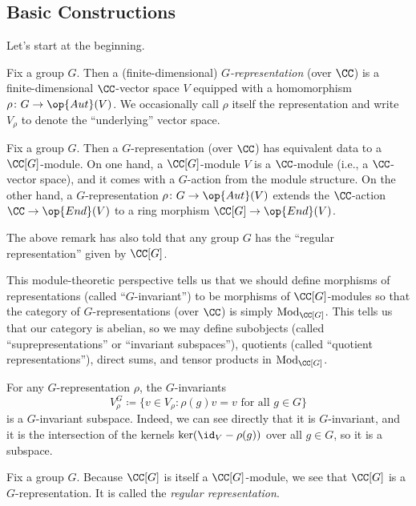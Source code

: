 \documentclass{article}
\begin{document}
\subsection{Basic Constructions}
Let's start at the beginning.
\begin{definition}[representation]
	Fix a group $G$. Then a (finite-dimensional) \textit{$G$-representation} (over $\CC$) is a finite-dimensional $\CC$-vector space $V$ equipped with a homomorphism $\rho\colon G\to\op{Aut}(V)$. We occasionally call $\rho$ itself the representation and write $V_\rho$ to denote the ``underlying'' vector space.
\end{definition}
\begin{remark}
	Fix a group $G$. Then a $G$-representation (over $\CC$) has equivalent data to a $\CC[G]$-module. On one hand, a $\CC[G]$-module $V$ is a $\CC$-module (i.e., a $\CC$-vector space), and it comes with a $G$-action from the module structure. On the other hand, a $G$-representation $\rho\colon G\to\op{Aut}(V)$ extends the $\CC$-action $\CC\to\op{End}(V)$ to a ring morphism $\CC[G]\to\op{End}(V)$.
\end{remark}
\begin{example}
	The above remark has also told that any group $G$ has the ``regular representation'' given by $\CC[G]$.
\end{example}
This module-theoretic perspective tells us that we should define morphisms of representations (called ``$G$-invariant'') to be morphisms of $\CC[G]$-modules so that the category of $G$-representations (over $\CC$) is simply $\mathrm{Mod}_{\CC[G]}$. This tells us that our category is abelian, so we may define subobjects (called ``suprepresentations'' or ``invariant subspaces''), quotients (called ``quotient representations''), direct sums, and tensor products in $\mathrm{Mod}_{\CC[G]}$.
\begin{example}
	For any $G$-representation $\rho$, the $G$-invariants
	\[V^G_\rho\coloneqq\{v\in V_\rho:\rho(g)v=v\text{ for all }g\in G\}\]
	is a $G$-invariant subspace. Indeed, we can see directly that it is $G$-invariant, and it is the intersection of the kernels $\ker({\id_V}-\rho(g))$ over all $g\in G$, so it is a subspace.
\end{example}
\begin{definition}
	Fix a group $G$. Because $\CC[G]$ is itself a $\CC[G]$-module, we see that $\CC[G]$ is a $G$-representation. It is called the \textit{regular representation}.
\end{definition}
\end{document}
